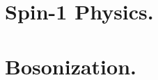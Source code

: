  


\section{Spin-1 Physics.}


\section{Bosonization.}
\begin{comment}
Considere un sistema de partículas bajo la influencia de un potencial estático y periódico, por ejemplo, de la forma $V(x)=V(x+R)$, siendo $R$ un vector de la red. Se definen como funciones de Bloch aquellas funciones que permiten describir el sistema dentro de la zona de Brillouin, analíticamente se definen de la forma $\phi(\boldsymbol{x})=u_{\boldsymbol{k}}(\boldsymbol{x}) \exp (i \boldsymbol{k} \cdot \boldsymbol{x}) $ donde $u_{\boldsymbol{k}}(\boldsymbol{x})$ tiene la periodicidad de la red con $u_{\boldsymbol{k}}(x) = u_{\boldsymbol{k}} (\boldsymbol{x+R}) $ y $\boldsymbol{k}$ pertenece a la zona de Brillouin \cite{book:17644_Kittel}.\\ \\
Una vez definidas las funciones de onda de Bloch, se pueden definir las funciones de Wannier como la transformada de Fourier de las funciones de onda de Bloch,
\begin{equation} \label{wannier}
    W_j(x)=\frac{1}{\sqrt{L}} \sum_k e^{\frac{i j k R}{\hbar}} \phi_k(x) \quad \text { junto a } \quad \int d x W_i^*(x) W_j(x)=\delta_{i j} \text {,}
\end{equation}
a su vez satisfacen,
\end{comment}





